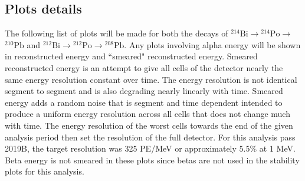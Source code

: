 \subsection{Plots details}
The following list of plots will be made for both the decays of $^{214}\textrm{Bi}\rightarrow$$^{214}\textrm{Po}\rightarrow$$^{210}\textrm{Pb}$ and $^{212}\textrm{Bi}\rightarrow$$^{212}\textrm{Po}\rightarrow$$^{208}\textrm{Pb}$. Any plots involving alpha energy will be shown in reconstructed energy and ``smeared" reconstructed energy. Smeared reconstructed energy is an attempt to give all cells of the detector nearly the same energy resolution constant over time. The energy resolution is not identical segment to segment and is also degrading nearly linearly with time. Smeared energy adds a random noise that is segment and time dependent intended to produce a uniform energy resolution across all cells that does not change much with time. The energy resolution of the worst cells towards the end of the given analysis period then set the resolution of the full detector. For this analysis pass 2019B, the target resolution was 325 PE/MeV or approximately 5.5\% at 1 MeV. Beta energy is not smeared in these plots since betas are not used in the stability plots for this analysis.

